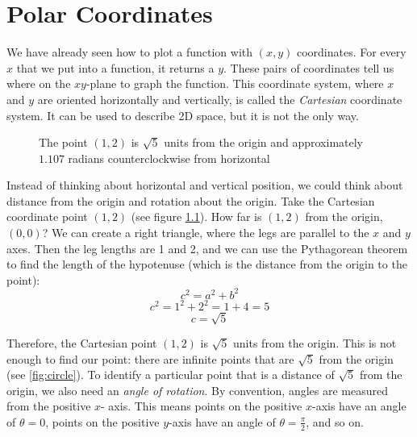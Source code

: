 \chapter{Polar Coordinates}

We have already seen how to plot a function with $(x,y)$ coordinates. For 
every $x$ that we put into a function, it returns a $y$. These pairs of 
coordinates tell us where on the $xy$-plane to graph the function. This 
coordinate system, where $x$ and $y$ are oriented horizontally and vertically, 
is called the \textit{Cartesian} coordinate system. It can be used to describe 
2D space, but it is not the only way. 

\begin{figure}[htbp]
\centering
    \label{fig:cartesian}
    \caption{The point $(1, 2)$ is $\sqrt{5}$ units from the origin and 
    approximately $1.107$ radians counterclockwise from horizontal}
    \end{figure}

Instead of thinking about horizontal and vertical position, we could think 
about distance from the origin and rotation about the origin. Take the 
Cartesian coordinate point $(1, 2)$ (see figure \ref{fig:cartesian}). How far is 
$(1,2)$ from the origin, $(0,0)$? We can create a right triangle, where the 
legs are parallel to the $x$ and $y$ axes. Then the leg lengths are 1 and 2, 
and we can use the Pythagorean theorem to find the length of the hypotenuse 
(which is the distance from the origin to the point):
$$c^2 = a^2 + b^2$$
$$c^2 = 1^2 + 2^2 = 1 + 4 = 5$$
$$c = \sqrt{5}$$

Therefore, the Cartesian point $(1, 2)$ is $\sqrt{5}$ units from the origin. 
This is not enough to find our point: there are infinite points that are 
$\sqrt{5}$ from the origin (see \ref{fig:circle}). To identify a particular point 
that is a distance of $\sqrt{5}$ from the origin, we also need an \textit{
angle of rotation}. By convention, angles are measured from the positive $x$-
axis. This means points on the positive $x$-axis have an angle of $\theta = 
0$, points on the positive $y$-axis have an angle of $\theta = \frac{\pi}{2}$, 
and so on. 

